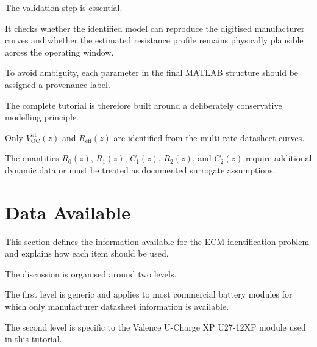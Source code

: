 \documentclass[a4paper,12pt]{article}
\begin{document}
The validation step is essential.

It checks whether the identified model can reproduce the digitised manufacturer curves and whether the estimated resistance profile remains physically plausible across the operating window.

To avoid ambiguity, each parameter in the final MATLAB structure should be assigned a provenance label.

\begin{center}
\end{center}

The complete tutorial is therefore built around a deliberately conservative modelling principle.

Only \(V_{\mathrm{OC}}^{\mathrm{fit}}(z)\) and \(R_{\mathrm{eff}}(z)\) are identified from the multi-rate datasheet curves.

The quantities \(R_0(z)\), \(R_1(z)\), \(C_1(z)\), \(R_2(z)\), and \(C_2(z)\) require additional dynamic data or must be treated as documented surrogate assumptions.

\clearpage
\newpage
\section{Data Available}
\label{sec:data_available}

This section defines the information available for the ECM-identification problem and explains how each item should be used.

The discussion is organised around two levels.

The first level is generic and applies to most commercial battery modules for which only manufacturer datasheet information is available.

The second level is specific to the Valence U-Charge XP U27-12XP module used in this tutorial.
\end{document}
